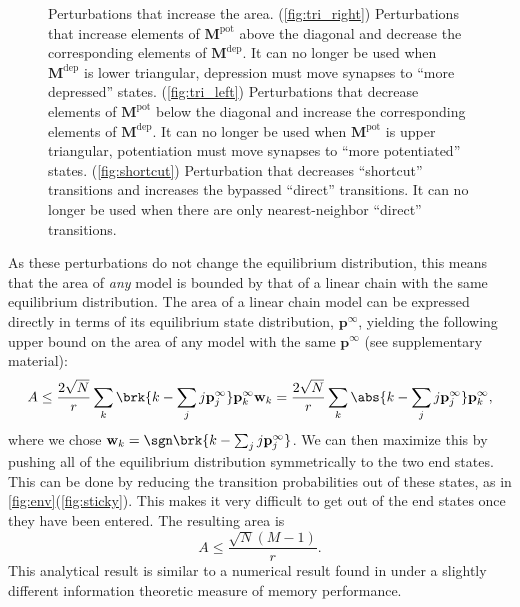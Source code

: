 \documentclass{article} %
\newcommand{\pr}{\mathbf{p}}
\newcommand{\eq}{\pr^\infty}
\newcommand{\w}{\mathbf{w}}
\newcommand{\M}{\mathbf{M}}
\newcommand{\pot}{^{\text{pot}}}
\newcommand{\dep}{^{\text{dep}}}
\begin{document}
\begin{figure}[tbp]
 \begin{center}
 \begin{myenuma}
  \item{}\label{fig:tri_right}\hp
  \item{}\label{fig:tri_left}\hp
  \item{}\label{fig:shortcut}
 \end{myenuma}
 \end{center}
  \caption{Perturbations that increase the area.
  (\ref{fig:tri_right}) Perturbations that increase elements of $\M\pot$ above the diagonal and decrease the corresponding elements of $\M\dep$. It can no longer be used when $\M\dep$ is lower triangular, \ie depression must move synapses to ``more depressed'' states.
  (\ref{fig:tri_left}) Perturbations that decrease elements of $\M\pot$ below the diagonal and increase the corresponding elements of $\M\dep$. It can no longer be used when $\M\pot$ is upper triangular, \ie potentiation must move synapses to ``more potentiated'' states.
  (\ref{fig:shortcut}) Perturbation that decreases ``shortcut'' transitions and increases the bypassed ``direct'' transitions. It can no longer be used when there are only nearest-neighbor ``direct'' transitions.
  }\label{fig:perts}
\end{figure}

As these perturbations do not change the equilibrium distribution, this means that the area of \emph{any} model is bounded by that of a linear chain with the same equilibrium distribution.
The area of a linear chain model can be expressed directly in terms of its equilibrium state distribution, $\eq$, yielding the following upper bound on the area of any model with the same $\eq$ (see supplementary material):
%
\begin{equation}\label{eq:multistatearea}
  A \leq \frac{2\sqrt{N}}{r} \sum_k \brk{k - \sum_j j\eq_j} \eq_k \w_k
    = \frac{2\sqrt{N}}{r} \sum_k \abs{k - \sum_j j\eq_j} \eq_k ,
\end{equation}
%
where we chose $\w_k=\sgn\brk{k - \sum_j j\eq_j}$.
We can then maximize this by pushing all of the equilibrium distribution symmetrically to the two end states.
This can be done by reducing the transition probabilities out of these states, as in \autoref{fig:env}(\ref{fig:sticky}).%
This makes it very difficult to get out of the end states once they have been entered.
The resulting area is
%
\begin{equation}\label{eq:max_area}
  A \leq \frac{\sqrt{N}(M-1)}{r}.
\end{equation}
%
This analytical result is similar to a numerical result found in \cite{Barrett2008discrete} under a slightly different information theoretic measure of memory performance.
\end{document}
